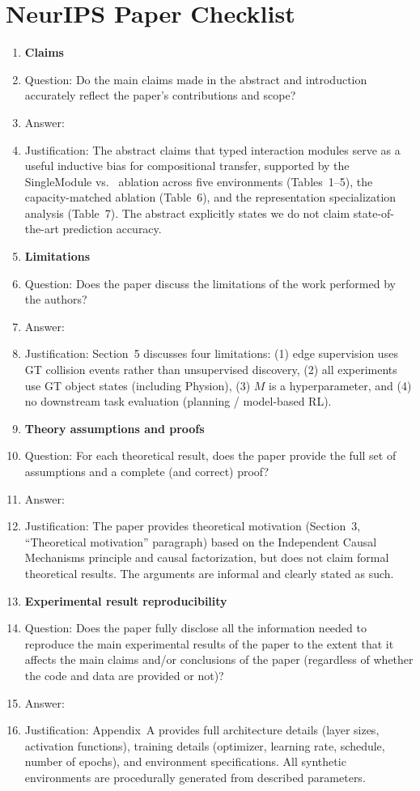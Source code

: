 \section*{NeurIPS Paper Checklist}

\begin{enumerate}

\item {\bf Claims}
    \item[] Question: Do the main claims made in the abstract and introduction accurately reflect the paper's contributions and scope?
    \item[] Answer: \answerYes{}
    \item[] Justification: The abstract claims that typed interaction modules serve as a useful inductive bias for compositional transfer, supported by the SingleModule vs.\ \ours{} ablation across five environments (Tables~1--5), the capacity-matched ablation (Table~6), and the representation specialization analysis (Table~7). The abstract explicitly states we do not claim state-of-the-art prediction accuracy.

\item {\bf Limitations}
    \item[] Question: Does the paper discuss the limitations of the work performed by the authors?
    \item[] Answer: \answerYes{}
    \item[] Justification: Section~5 discusses four limitations: (1) edge supervision uses GT collision events rather than unsupervised discovery, (2) all experiments use GT object states (including Physion), (3) $M$ is a hyperparameter, and (4) no downstream task evaluation (planning / model-based RL).

\item {\bf Theory assumptions and proofs}
    \item[] Question: For each theoretical result, does the paper provide the full set of assumptions and a complete (and correct) proof?
    \item[] Answer: \answerNA{}
    \item[] Justification: The paper provides theoretical motivation (Section~3, ``Theoretical motivation'' paragraph) based on the Independent Causal Mechanisms principle and causal factorization, but does not claim formal theoretical results. The arguments are informal and clearly stated as such.

    \item {\bf Experimental result reproducibility}
    \item[] Question: Does the paper fully disclose all the information needed to reproduce the main experimental results of the paper to the extent that it affects the main claims and/or conclusions of the paper (regardless of whether the code and data are provided or not)?
    \item[] Answer: \answerYes{}
    \item[] Justification: Appendix~A provides full architecture details (layer sizes, activation functions), training details (optimizer, learning rate, schedule, number of epochs), and environment specifications. All synthetic environments are procedurally generated from described parameters.



\end{enumerate}
